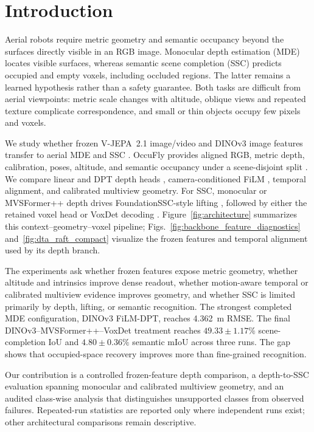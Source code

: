 \section{Introduction}
\label{sec:introduction}

Aerial robots require metric geometry and semantic occupancy beyond the surfaces directly visible in an RGB image. Monocular depth estimation (MDE) locates visible surfaces, whereas semantic scene completion (SSC) predicts occupied and empty voxels, including occluded regions. The latter remains a learned hypothesis rather than a safety guarantee. Both tasks are difficult from aerial viewpoints: metric scale changes with altitude, oblique views and repeated texture complicate correspondence, and small or thin objects occupy few pixels and voxels.

We study whether frozen V-JEPA~2.1 image/video and DINOv3 image features transfer to aerial MDE and SSC \cite{murlabadia2026vjepa21,simeoni2025dinov3}. OccuFly provides aligned RGB, metric depth, calibration, poses, altitude, and semantic occupancy under a scene-disjoint split \cite{gross2026occufly}. We compare linear and DPT depth heads \cite{ranftl2021dpt}, camera-conditioned FiLM \cite{perez2018film}, temporal alignment, and calibrated multiview geometry. For SSC, monocular or MVSFormer++ depth \cite{cao2024mvsformerpp} drives FoundationSSC-style lifting \cite{chen2025foundationssc}, followed by either the retained voxel head or VoxDet decoding \cite{li2025voxdet}. Figure~\ref{fig:architecture} summarizes this context--geometry--voxel pipeline; Figs.~\ref{fig:backbone_feature_diagnostics} and~\ref{fig:dta_raft_compact} visualize the frozen features and temporal alignment used by its depth branch.

The experiments ask whether frozen features expose metric geometry, whether altitude and intrinsics improve dense readout, whether motion-aware temporal or calibrated multiview evidence improves geometry, and whether SSC is limited primarily by depth, lifting, or semantic recognition. The strongest completed MDE configuration, DINOv3 FiLM-DPT, reaches 4.362~m RMSE. The final DINOv3--MVSFormer++--VoxDet treatment reaches $49.33\pm1.17\%$ scene-completion IoU and $4.80\pm0.36\%$ semantic mIoU across three runs. The gap shows that occupied-space recovery improves more than fine-grained recognition.

Our contribution is a controlled frozen-feature depth comparison, a depth-to-SSC evaluation spanning monocular and calibrated multiview geometry, and an audited class-wise analysis that distinguishes unsupported classes from observed failures. Repeated-run statistics are reported only where independent runs exist; other architectural comparisons remain descriptive.
